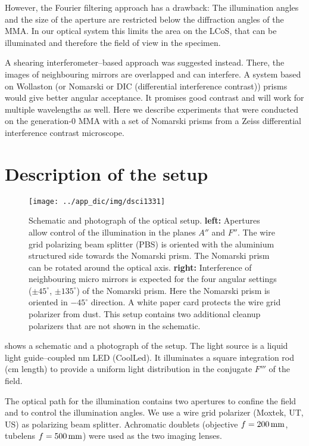 However, the Fourier filtering approach has a drawback: The
illumination angles and the size of the aperture are restricted below
the diffraction angles of the MMA. In our optical system this limits
the area on the LCoS, that can be illuminated and therefore the field
of view in the specimen.

A shearing interferometer--based approach was suggested
instead. There, the images of neighbouring mirrors are overlapped and
can interfere. A system based on Wollaston (or Nomarski or DIC
(differential interference contrast)) prisms would give better angular
acceptance. It promises good contrast and will work for multiple
wavelengths as well. Here we describe experiments that were conducted
on the generation-0 MMA with a set of Nomarski prisms from a Zeiss
differential interference contrast microscope.
\section{Description of the setup}
\begin{figure}[ht]
  \centering
  \texttt{[image: ../app\_dic/img/dsci1331]}
  \caption{ Schematic and photograph of the optical setup.  {\bf
      left:} Apertures allow control of the illumination in the planes
    $A''$ and $F''$. The wire grid polarizing beam splitter (PBS) is
    oriented with the aluminium structured side towards the Nomarski
    prism. The Nomarski prism can be rotated around the optical
    axis. {\bf right:} Interference of neighbouring micro mirrors is
    expected for the four angular settings ($\pm 45^\circ$, $\pm
    135^\circ$) of the Nomarski prism.  Here the Nomarski prism is
    oriented in $-45^\circ$ direction.  A white paper card protects
    the wire grid polarizer from dust.  This setup contains two
    additional cleanup polarizers that are not shown in the
    schematic.}
  \label{fig:dic_mma}
\end{figure}
 shows a schematic and a photograph of the setup.
The light source is a liquid light guide--coupled \unit[480]{nm} LED
(CoolLed). It illuminates a square integration rod (\unit[10]{cm}
length) to provide a uniform light distribution in the conjugate
$F'''$ of the field. 

The optical path for the illumination contains two apertures to
confine the field and to control the illumination angles. We use a
wire grid polarizer (Moxtek, UT, US) as polarizing beam splitter.
Achromatic doublets (objective $f=\unit[200]{mm}$, tubelens
$f=\unit[500]{mm}$) were used as the two imaging lenses.


